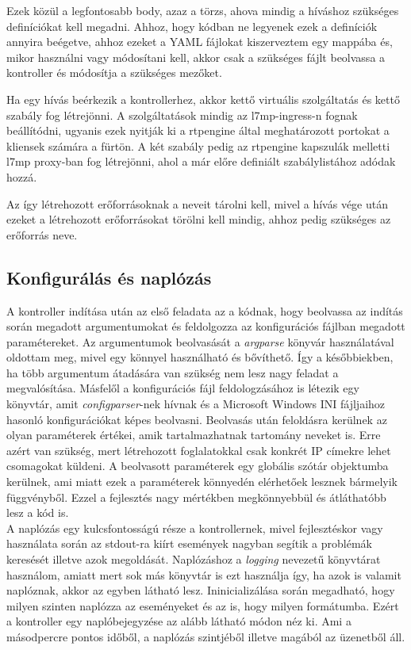 Ezek közül a legfontosabb body, azaz a törzs, ahova mindig a híváshoz szükséges definíciókat
kell megadni. Ahhoz, hogy kódban ne legyenek ezek a definíciók annyira beégetve, ahhoz
ezeket a YAML fájlokat kiszerveztem egy mappába és, mikor használni vagy módosítani kell,
akkor csak a szükséges fájlt beolvassa a kontroller és módosítja a szükséges mezőket.

Ha egy hívás beérkezik a kontrollerhez, akkor kettő virtuális szolgáltatás és kettő
szabály fog létrejönni. A szolgáltatások mindig az l7mp-ingress-n fognak beállítódni, 
ugyanis ezek nyitják ki a rtpengine által meghatározott portokat a kliensek számára
a fürtön. A két szabály pedig az rtpengine kapszulák melletti l7mp proxy-ban 
fog létrejönni, ahol a már előre definiált szabálylistához adódak hozzá. 

Az így létrehozott erőforrásoknak a neveit tárolni kell, mivel a hívás vége után ezeket
a létrehozott erőforrásokat törölni kell mindig, ahhoz pedig szükséges az erőforrás 
neve. 

\subsection{Konfigurálás és naplózás}

A kontroller indítása után az első feladata az a kódnak, hogy beolvassa az indítás
során megadott argumentumokat és feldolgozza az konfigurációs fájlban megadott 
paramétereket. Az argumentumok beolvasását a \textit{argparse} könyvár használatával
oldottam meg, mivel egy könnyel használható és bővíthető. Így a későbbiekben, ha 
több argumentum átadására van szükség nem lesz nagy feladat a megvalósítása. Másfelől
a konfigurációs fájl feldologzásához is létezik egy könyvtár, amit \textit{configparser}-nek
hívnak és a Microsoft Windows INI fájljaihoz hasonló konfigurációkat képes beolvasni. Beolvasás
után feloldásra kerülnek az olyan paraméterek értékei, amik tartalmazhatnak tartomány neveket
is. Erre azért van szükség, mert létrehozott foglalatokkal csak konkrét IP címekre lehet 
csomagokat küldeni. A beolvasott paraméterek egy globális szótár objektumba kerülnek, ami 
miatt ezek a paraméterek könnyedén elérhetőek lesznek bármelyik függvényből. Ezzel a fejlesztés
nagy mértékben megkönnyebbül és átláthatóbb lesz a kód is. \\

A naplózás egy kulcsfontosságú része a kontrollernek, mivel fejlesztéskor vagy használata
során az stdout-ra kiírt események nagyban segítik a problémák keresését illetve azok 
megoldását. Naplózáshoz a \textit{logging} nevezetű könyvtárat használom, amiatt mert 
sok más könyvtár is ezt használja így, ha azok is valamit naplóznak, akkor az egyben 
látható lesz. Ininicializálása során megadható, hogy milyen szinten naplózza az eseményeket 
és az is, hogy milyen formátumba. Ezért a kontroller egy naplóbejegyzése az alább látható 
módon néz ki. Ami a másodpercre pontos időből, a naplózás szintjéből illetve magából az 
üzenetből áll.

